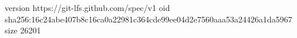 version https://git-lfs.github.com/spec/v1
oid sha256:16c24abe407b8c16ca0a22981c364cde99ee04d2e7560aaa53a24426a1da5967
size 26201
